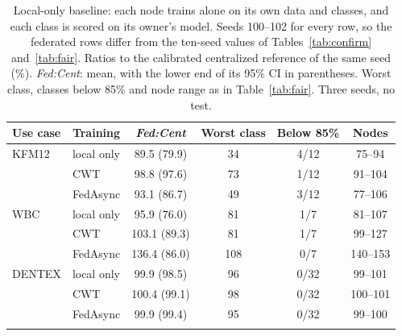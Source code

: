 \documentclass[pdflatex,sn-mathphys-num]{sn-jnl}
\newcommand{\fedcent}{\textit{Fed:Cent}}
\begin{document}
\begin{table}[t]
\caption{Local-only baseline: each node trains alone on its own data and classes, and each class is scored on its owner's model. Seeds 100--102 for every row, so the federated rows differ from the ten-seed values of Tables~\ref{tab:confirm} and~\ref{tab:fair}. Ratios to the calibrated centralized reference of the same seed (\%). \fedcent{}: mean, with the lower end of its 95\% CI in parentheses. Worst class, classes below 85\% and node range as in Table~\ref{tab:fair}. Three seeds, no test.}\label{tab:local}
\footnotesize
\begin{tabular*}{\textwidth}{@{\extracolsep\fill}llcccc}
\toprule
Use case & Training & \fedcent{} & Worst class & Below 85\% & Nodes \\
\midrule
KFM12 & local only & 89.5 (79.9) & 34 & 4/12 & 75--94 \\
 & CWT & 98.8 (97.6) & 73 & 1/12 & 91--104 \\
 & FedAsync & 93.1 (86.7) & 49 & 3/12 & 77--106 \\
\midrule
WBC & local only & 95.9 (76.0) & 81 & 1/7 & 81--107 \\
 & CWT & 103.1 (89.3) & 81 & 1/7 & 99--127 \\
 & FedAsync & 136.4 (86.0) & 108 & 0/7 & 140--153 \\
\midrule
DENTEX & local only & 99.9 (98.5) & 96 & 0/32 & 99--101 \\
 & CWT & 100.4 (99.1) & 98 & 0/32 & 100--101 \\
 & FedAsync & 99.9 (99.4) & 95 & 0/32 & 99--100 \\
\botrule
\end{tabular*}
\end{table}
\end{document}
